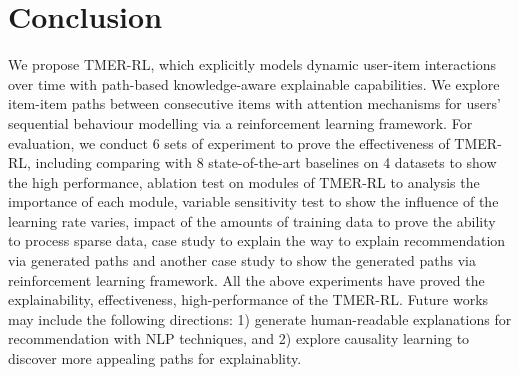 \documentclass[10pt,journal,compsoc, twocolumn]{IEEEtran}
\begin{document}
\section{Conclusion}
We propose TMER-RL, which explicitly models dynamic user-item interactions over time with path-based knowledge-aware explainable capabilities. We explore item-item paths between consecutive items with attention mechanisms for users’ sequential behaviour
modelling via a reinforcement learning framework. For evaluation, we conduct 6 sets of experiment to prove the effectiveness of TMER-RL, including comparing with 8 state-of-the-art baselines on 4 datasets to show the high performance, ablation test on modules of TMER-RL to analysis the importance of each module, variable sensitivity test to show the influence of the learning rate varies, impact of the amounts of training data to prove the ability to process sparse data, case study to explain the way to explain recommendation via generated paths and another case study to show the generated paths via reinforcement learning framework. All the above experiments have proved the explainability, effectiveness, high-performance of the TMER-RL. Future works may include the following directions: 1) generate human-readable explanations for recommendation with NLP techniques, and 2) explore causality learning \cite{xu2020causality} to discover
more appealing paths for explainablity.






%
\end{document}
